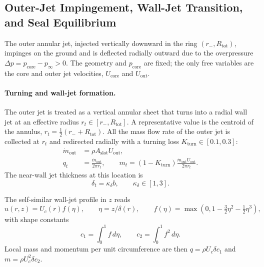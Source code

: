 \documentclass[11pt,a4paper]{article}
\begin{document}

\subsection*{Outer-Jet Impingement, Wall-Jet Transition, and Seal Equilibrium}

The outer annular jet, injected vertically downward in the ring $(r_- , R_{\mathrm{tot}})$,
impinges on the ground and is deflected radially outward due to the overpressure
$\Delta p = p_{\mathrm{core}} - p_\infty > 0$.
The geometry and $p_{\mathrm{core}}$ are fixed; the only free variables are the core and outer jet velocities,
$U_{\mathrm{core}}$ and $U_{\mathrm{out}}$.

\paragraph{Turning and wall-jet formation.}
The outer jet is treated as a vertical annular sheet that turns into a radial wall jet at
an effective radius $r_t \in [r_-, R_{\mathrm{tot}}]$.
A representative value is the centroid of the annulus,
$r_t = \tfrac12 (r_- + R_{\mathrm{tot}})$.
All the mass flow rate of the outer jet is collected at $r_t$
and redirected radially with a turning loss $K_{\mathrm{turn}} \in [0.1,0.3]$:
\begin{align}
\dot m_{\mathrm{out}} &= \rho A_{\mathrm{slot}} U_{\mathrm{out}},\\
q_t &= \frac{\dot m_{\mathrm{out}}}{2\pi r_t}, \qquad
m_t = (1-K_{\mathrm{turn}})\frac{\dot m_{\mathrm{out}} U_{\mathrm{out}}}{2\pi r_t}.
\end{align}
The near-wall jet thickness at this location is
\begin{equation}
\delta_t = \kappa_\delta b, \qquad \kappa_\delta \in [1,3].
\end{equation}

The self-similar wall-jet profile in $z$ reads
\begin{equation}
u(r,z) = U_c(r) f(\eta), \qquad \eta = z/\delta(r), \qquad
f(\eta) = \max(0, 1-\tfrac32 \eta^2 - \tfrac12 \eta^3),
\end{equation}
with shape constants
\begin{equation}
c_1 = \int_0^1 f\,d\eta, \qquad c_2 = \int_0^1 f^2\,d\eta.
\end{equation}
Local mass and momentum per unit circumference are then
$q = \rho U_c \delta c_1$ and $m = \rho U_c^2 \delta c_2$.
\end{document}
